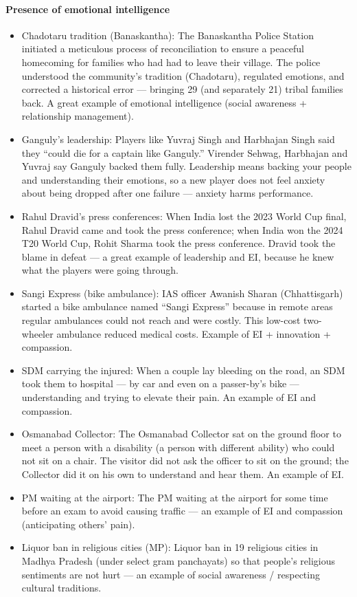 \paragraph{Presence of emotional intelligence}
\begin{itemize}
\item Chadotaru tradition (Banaskantha): The Banaskantha Police Station initiated a meticulous process of reconciliation to ensure a peaceful homecoming for families who had had to leave their village. The police understood the community's tradition (Chadotaru), regulated emotions, and corrected a historical error --- bringing 29 (and separately 21) tribal families back. A great example of emotional intelligence (social awareness + relationship management).
\item Ganguly's leadership: Players like Yuvraj Singh and Harbhajan Singh said they ``could die for a captain like Ganguly.'' Virender Sehwag, Harbhajan and Yuvraj say Ganguly backed them fully. Leadership means backing your people and understanding their emotions, so a new player does not feel anxiety about being dropped after one failure --- anxiety harms performance.
\item Rahul Dravid's press conferences: When India lost the 2023 World Cup final, Rahul Dravid came and took the press conference; when India won the 2024 T20 World Cup, Rohit Sharma took the press conference. Dravid took the blame in defeat --- a great example of leadership and EI, because he knew what the players were going through.
\item Sangi Express (bike ambulance): IAS officer Awanish Sharan (Chhattisgarh) started a bike ambulance named ``Sangi Express'' because in remote areas regular ambulances could not reach and were costly. This low-cost two-wheeler ambulance reduced medical costs. Example of EI + innovation + compassion.
\item SDM carrying the injured: When a couple lay bleeding on the road, an SDM took them to hospital --- by car and even on a passer-by's bike --- understanding and trying to elevate their pain. An example of EI and compassion.
\item Osmanabad Collector: The Osmanabad Collector sat on the ground floor to meet a person with a disability (a person with different ability) who could not sit on a chair. The visitor did not ask the officer to sit on the ground; the Collector did it on his own to understand and hear them. An example of EI.
\item PM waiting at the airport: The PM waiting at the airport for some time before an exam to avoid causing traffic --- an example of EI and compassion (anticipating others' pain).
\item Liquor ban in religious cities (MP): Liquor ban in 19 religious cities in Madhya Pradesh (under select gram panchayats) so that people's religious sentiments are not hurt --- an example of social awareness / respecting cultural traditions.
\end{itemize}

